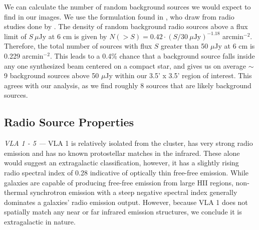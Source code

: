 \documentclass[apj]{emulateapj}
\begin{document}
We can calculate the number of random background sources we would expect to find in our images. We use the formulation found in \citet{Shirley07}, who draw from radio studies done by \citet{Fomalont91}. The density of random background radio sources above a flux limit of $S\ \mu$Jy at 6 cm is given by $N(>S) = 0.42\cdot(S/30\ \mu \text{Jy})^{-1.18}$ arcmin$^{-2}$. Therefore, the total number of sources with flux $S$ greater than 50 $\mu$Jy at 6 cm is 0.229 arcmin$^{-2}$. This leads to a 0.4\% chance that a background source falls inside any one synthesized beam centered on a compact star, and gives us on average $\sim$9 background sources above 50 $\mu$Jy within our 3.5' x 3.5' region of interest. This agrees with our analysis, as we find roughly 8 sources that are likely background sources.


%
%


\subsection{Radio Source Properties}
\label{sec:radio source properties}

\newcommand{\sourcenote}[1]{\textit{#1 ---}}

\sourcenote{VLA 1 - 5}
VLA 1 is relatively isolated from the cluster, has very strong radio emission and has no known protostellar matches in the infrared. These alone would suggest an extragalactic classification, however, it has a slightly rising radio spectral index of 0.28 indicative of optically thin free-free emission. While galaxies are capable of producing  free-free emission from large HII regions, non-thermal synchrotron emission with a steep negative spectral index generally dominates a galaxies' radio emission output. However, because VLA 1 does not spatially match any near or far infrared emission structures, we conclude it is extragalactic in nature.
\end{document}
